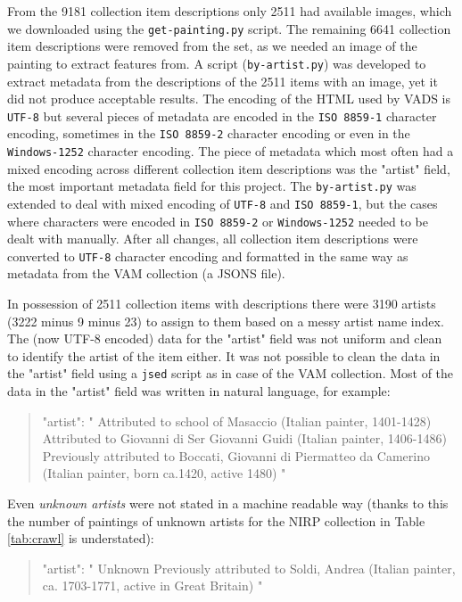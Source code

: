 \documentclass[11pt,a4paper,twoside,openright]{report}
\begin{document}
From the 9181 collection item descriptions only 2511 had available images,
which we downloaded using the \texttt{get-painting.py} script.  The remaining
6641 collection item descriptions were removed from the set, as we needed an
image of the painting to extract features from.  A script
(\texttt{by-artist.py}) was developed to extract metadata from the descriptions
of the 2511 items with an image, yet it did not produce acceptable results.
The encoding of the HTML used by VADS is \texttt{UTF-8} but several pieces of
metadata are encoded in the \texttt{ISO 8859-1} character encoding, sometimes
in the \texttt{ISO 8859-2} character encoding or even in the
\texttt{Windows-1252} character encoding.  The piece of metadata which most
often had a mixed encoding across different collection item descriptions was
the "artist" field, the most important metadata field for this project.  The
\texttt{by-artist.py} was extended to deal with mixed encoding of
\texttt{UTF-8} and \texttt{ISO 8859-1}, but the cases where characters were
encoded in \texttt{ISO 8859-2} or \texttt{Windows-1252} needed to be dealt with
manually.  After all changes, all collection item descriptions were converted
to \texttt{UTF-8} character encoding and formatted in the same way as metadata
from the VAM collection (a JSONS file).

In possession of 2511 collection items with descriptions there were 3190
artists (3222 minus 9 minus 23) to assign to them based on a messy artist name
index.  The (now UTF-8 encoded) data for the "artist" field was not uniform and
clean to identify the artist of the item either.  It was not possible to clean
the data in the "artist" field using a \texttt{jsed} script as in case of the
VAM collection.  Most of the data in the "artist" field was written in natural
language, for example:

\begin{quote}
"artist": " Attributed to school of Masaccio (Italian painter, 1401-1428)
Attributed to Giovanni di Ser Giovanni Guidi (Italian painter, 1406-1486)
Previously attributed to Boccati, Giovanni di Piermatteo da Camerino (Italian
painter, born ca.1420, active 1480) "
\end{quote}

Even \emph{unknown artists} were not stated in a machine readable way (thanks
to this the number of paintings of unknown artists for the NIRP collection in
Table \ref{tab:crawl} is understated):

\begin{quote}
"artist": " Unknown  Previously attributed to Soldi, Andrea (Italian painter,
ca.  1703-1771, active in Great Britain) "
\end{quote}
\end{document}
